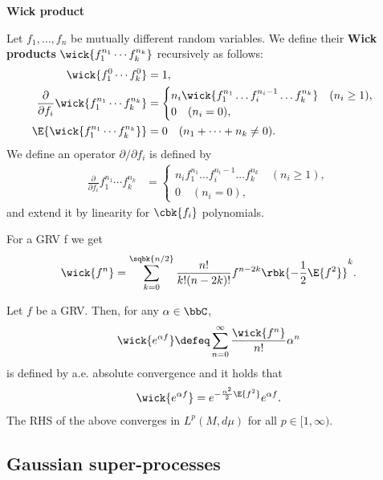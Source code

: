 \documentclass[openany, a4paper, oneside]{jsbook}
\begin{document}
\vspace{1em}

\textbf{Wick product}

Let $f_1, \dots, f_n$ be mutually different random variables.
We define their \textbf{Wick products} $\wick{f_1^{n_1} \cdots f_k^{n_k}}$ recursively as follows:
\begin{align}
 \wick{f_1^{0} \cdots f_k^{0}}
 &= 1, \\
 \frac{\partial}{\partial f_i} \wick{f_1^{n_1} \cdots f_k^{n_k}}
 &=
 \begin{cases}
  n_i \wick{f_1^{n_1} \dots f_i^{n_i - 1} \dots f_k^{n_k}} \quad (n_i \geq 1), \\
  0 \quad (n_i = 0),
 \end{cases} \\
 \E{ \wick{f_1^{n_1} \cdots f_k^{n_k}} }
 &= 0 \quad (n_1 + \cdots + n_k \neq 0).
\end{align}
We define an operator $\partial / \partial f_i$ is defined by
\begin{align}
 \frac{\partial}{\partial f_i} f_1^{n_1} \cdots f_k^{n_k}
 &=
 \begin{cases}
  n_i  f_1^{n_1} \dots f_i^{n_i - 1} \dots f_k^{n_k} \quad (n_i \geq 1), \\
  0 \quad (n_i = 0),
 \end{cases}
\end{align}
and extend it by linearity for $\cbk{f_i}$ polynomials.

\begin{prop}
 For a GRV f we get
 \begin{align}
  \wick{f^n}
  =
  \sum_{k=0}^{\sqbk{n/2}} \frac{n!}{k! (n-2k)!} f^{n - 2k} \rbk{- \frac{1}{2} \E{f^2}}^k.
 \end{align}
\end{prop}
\begin{prop}
 Let $f$ be a GRV.
 Then, for any $\alpha \in \bbC$,
 \begin{align}
  \wick{e^{\alpha f}}
  \defeq
  \sum_{n=0}^{\infty} \frac{\wick{f^n}}{n!} \alpha^n
 \end{align}
 is defined by a.e. absolute convergence and it holds that
 \begin{align}
  \wick{e^{\alpha f}}
  =
  e^{- \frac{\alpha^2}{2} \E{f^2}} e^{\alpha f}.
 \end{align}
 The RHS of the above converges in $L^p (M, d \mu)$ for all $p \in [1, \infty)$.
\end{prop}
\subsection{Gaussian super-processes}
\end{document}
